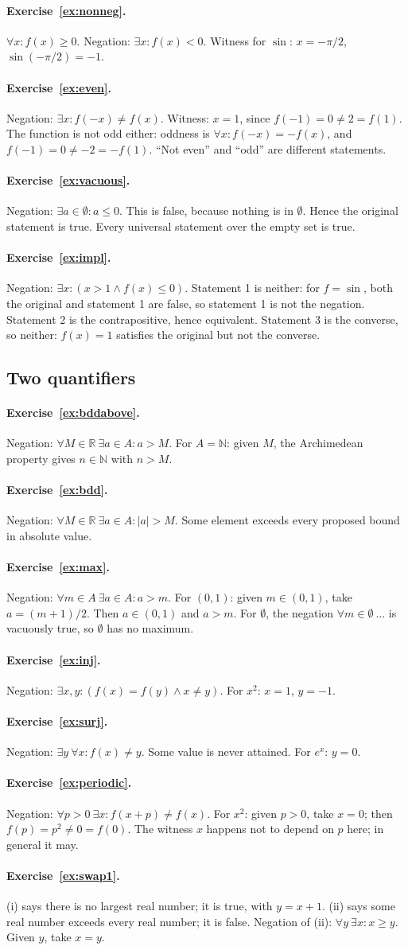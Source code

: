 \documentclass{workbook}
\theoremstyle{definition}
\newcommand{\N}{\mathbb{N}}
\newcommand{\R}{\mathbb{R}}
\newcommand{\ans}[1]{\paragraph{Exercise~\ref{#1}.}}
\begin{document}
\ans{ex:nonneg}
$\forall x : f(x) \ge 0$. Negation: $\exists x : f(x) < 0$. Witness for $\sin$: $x = -\pi/2$, $\sin(-\pi/2) = -1$.

\ans{ex:even}
Negation: $\exists x : f(-x) \ne f(x)$. Witness: $x = 1$, since $f(-1) = 0 \ne 2 = f(1)$. The function is not odd either: oddness is $\forall x : f(-x) = -f(x)$, and $f(-1) = 0 \ne -2 = -f(1)$. ``Not even'' and ``odd'' are different statements.

\ans{ex:vacuous}
Negation: $\exists a \in \emptyset : a \le 0$. This is false, because nothing is in $\emptyset$. Hence the original statement is true. Every universal statement over the empty set is true.

\ans{ex:impl}
Negation: $\exists x : (x > 1 \land f(x) \le 0)$. Statement 1 is neither: for $f = \sin$, both the original and statement 1 are false, so statement 1 is not the negation. Statement 2 is the contrapositive, hence equivalent. Statement 3 is the converse, so neither: $f(x) = 1$ satisfies the original but not the converse.

\subsection*{Two quantifiers}

\ans{ex:bddabove}
Negation: $\forall M \in \R\ \exists a \in A : a > M$. For $A = \N$: given $M$, the Archimedean property gives $n \in \N$ with $n > M$.

\ans{ex:bdd}
Negation: $\forall M \in \R\ \exists a \in A : |a| > M$. Some element exceeds every proposed bound in absolute value.

\ans{ex:max}
Negation: $\forall m \in A\ \exists a \in A : a > m$. For $(0,1)$: given $m \in (0,1)$, take $a = (m+1)/2$. Then $a \in (0,1)$ and $a > m$. For $\emptyset$, the negation $\forall m \in \emptyset\ \dots$ is vacuously true, so $\emptyset$ has no maximum.

\ans{ex:inj}
Negation: $\exists x, y : (f(x) = f(y) \land x \ne y)$. For $x^2$: $x = 1$, $y = -1$.

\ans{ex:surj}
Negation: $\exists y\ \forall x : f(x) \ne y$. Some value is never attained. For $e^x$: $y = 0$.

\ans{ex:periodic}
Negation: $\forall p > 0\ \exists x : f(x + p) \ne f(x)$. For $x^2$: given $p > 0$, take $x = 0$; then $f(p) = p^2 \ne 0 = f(0)$. The witness $x$ happens not to depend on $p$ here; in general it may.

\ans{ex:swap1}
(i) says there is no largest real number; it is true, with $y = x + 1$. (ii) says some real number exceeds every real number; it is false. Negation of (ii): $\forall y\ \exists x : x \ge y$. Given $y$, take $x = y$.
\end{document}

